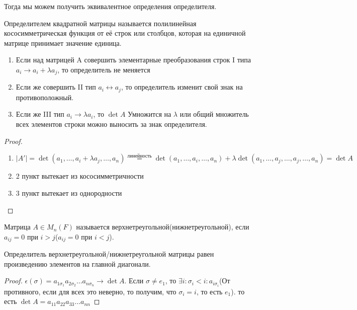 Тогда мы можем получить эквивалентное определения определителя.
\begin{definition}
	Определителем квадратной матрицы называется полилинейная кососимметрическая функция от её строк или столбцов, которая на единичной матрице принимает значение единица. 
\end{definition}
\begin{proposition}
	\begin{enumerate}
		\item Если над матрицей A совершить элементарные преобразования строк I типа \(a_i \to a_i + \lambda a_j\), то определитель не меняется 
		\item Если же совершить II тип \(a_i \longleftrightarrow a_j\), то определитель изменит свой знак на противоположный.
		\item Если же III тип \(a_i\to \lambda a_i\), то \(\det A\) Умножится на $\lambda$ или общий множитель всех элементов строки можно выносить за знак определителя.
	\end{enumerate}
\end{proposition}
\begin{proof}
	\begin{enumerate}
		\item \(|A'| = \det(a_1, \ldots, a_i+\lambda a_j, \ldots, a_n) \overset{\text{линейность}}{=} \det(a_1, \ldots, a_i, \ldots, a_n) + \lambda \det(a_1, \ldots, a_j, \ldots, a_j, \ldots, a_n) = \det A\)
		\item 2 пункт вытекает из кососимметричности
		\item 3 пункт вытекает из однородности
	\end{enumerate}
\end{proof}
\begin{definition}
	Матрица \(A\in M_n(F)\) называется верхнетреугольной(нижнетреугольной), если  \(a_{ij}=0 \) при \(i>j\)(\(a_{ij} = 0\) при \(i<j\)).
\end{definition}
\begin{proposition}
	Определитель верхнетреугольной/нижнетреугольной матрицы равен произведению элементов на главной диагонали.
\end{proposition}
\begin{proof}
	\(\epsilon(\sigma) = a_{1\sigma_1}a_{2\sigma_2}\ldots a_{n\sigma_n}\to \det A\). Если \(\sigma\ne e_1\), то \(\exists i: \sigma_i<i: a_{i\sigma_i} \)(От противного, если для всех это неверно, то получим, что $\sigma_i = i$, то есть \(e_1\)). то есть \(\det A = a_{11}a_{22}a_{33}\ldots a_{nn}\)
\end{proof}
